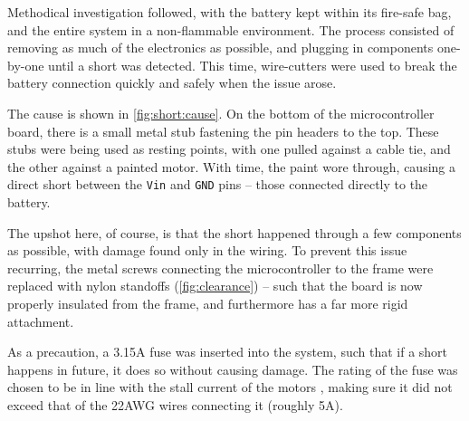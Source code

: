 \documentclass[main.tex]{subfiles}
\begin{document}
	Methodical investigation followed, with the battery kept within its fire-safe bag, and the entire system in a non-flammable environment. The process consisted of removing as much of the electronics as possible, and plugging in components one-by-one until a short was detected. This time, wire-cutters were used to break the battery connection quickly and safely when the issue arose.

	The cause is shown in \cref{fig:short:cause}. On the bottom of the microcontroller board, there is a small metal stub fastening the pin headers to the top. These stubs were being used as resting points, with one pulled against a cable tie, and the other against a painted motor. With time, the paint wore through, causing a direct short between the \texttt{Vin} and \texttt{GND} pins -- those connected directly to the battery.

	The upshot here, of course, is that the short happened through a few components as possible, with damage found only in the wiring. To prevent this issue recurring, the metal screws connecting the microcontroller to the frame were replaced with nylon standoffs (\cref{fig:clearance}) -- such that the board is now properly insulated from the frame, and furthermore has a far more rigid attachment.

	As a precaution, a 3.15A fuse was inserted into the system, such that if a short happens in future, it does so without causing damage. The rating of the fuse was chosen to be in line with the stall current of the motors \cite{motor}, making sure it did not exceed that of the 22AWG wires connecting it (roughly 5A).




\bib
\end{document}
